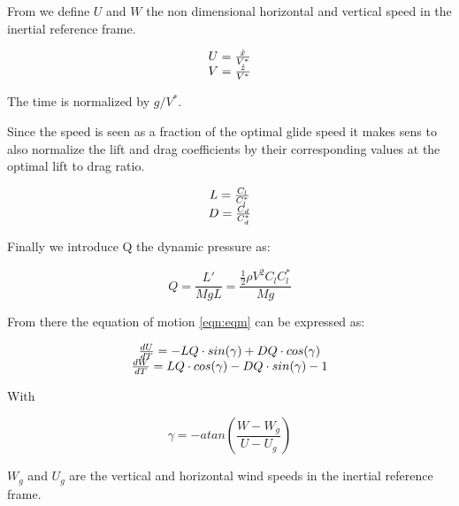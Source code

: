 \par From we define $U$ and $W$ the non dimensional horizontal and vertical speed in the inertial reference frame.

\begin{equation}
	\begin{array}[c]{c}
		U = \frac{\dot{x}}{V^*} \\
		V= \frac{\dot{z}}{V^*}
	\end{array}
	\label{eqn:non_dim_speed}
\end{equation}

The time is normalized by $g / V^*$.

\par Since the speed is seen as a fraction of the optimal glide speed it makes sens to also normalize the lift and drag coefficients by their corresponding values at the optimal lift to drag ratio.

\begin{equation}
	\begin{array}[c]{c}
		L= \frac{C_l}{C_l^*} \\
		D= \frac{C_d}{C_d^*} 
	\end{array}
	\label{eqn:non_dim_coef}
\end{equation}

\par Finally we introduce Q the dynamic pressure as:

\begin{equation}
	Q = \frac{L'}{MgL} = \frac{\frac{1}{2} \rho V^2 C_l C_l^* }{Mg}
	\label{eqn:dynamic_pressure}
\end{equation}

\par From there the equation of motion \ref{eqn:eqm} can be expressed as:

\begin{equation}
\begin{array}[c]{c}
	\frac{dU}{dT}= -LQ \cdot sin(\gamma) + DQ \cdot cos(\gamma) \\ 
	\frac{dW}{dT}= LQ \cdot cos(\gamma) - DQ \cdot sin(\gamma) - 1
	\end{array}
	\label{eqn:non_dim_eqm}
\end{equation}

With 

\begin{equation}
	\gamma = -atan(\frac{W-W_g}{U-U_g})
	\label{eqn:gamma_def}
\end{equation}

$W_g$ and $U_g$ are the vertical and horizontal wind speeds in the inertial reference frame.

